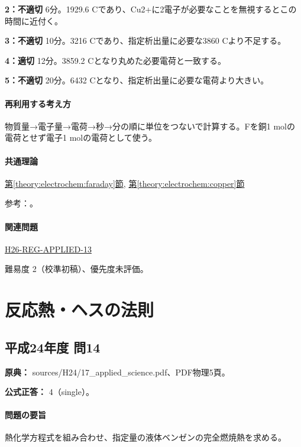 \noindent\textbf{2：不適切} 6分。1929.6 Cであり、Cu2+に2電子が必要なことを無視するとこの時間に近付く。\par

\noindent\textbf{3：不適切} 10分。3216 Cであり、指定析出量に必要な3860 Cより不足する。\par

\noindent\textbf{4：適切} 12分。3859.2 Cとなり丸めた必要電荷と一致する。\par

\noindent\textbf{5：不適切} 20分。6432 Cとなり、指定析出量に必要な電荷より大きい。\par

\paragraph{再利用する考え方} 物質量→電子量→電荷→秒→分の順に単位をつないで計算する。Fを銅1 molの電荷とせず電子1 molの電荷として使う。

\paragraph{共通理論} \hyperref[theory:electrochem:faraday]{第\ref*{theory:electrochem:faraday}節}, \hyperref[theory:electrochem:copper]{第\ref*{theory:electrochem:copper}節}

\par 参考：\cite{mit_redox2014}。

\paragraph{関連問題} \hyperref[q:h26-reg-applied-13]{H26-REG-APPLIED-13}

\par 難易度 2（校準初稿）、優先度未評価。

\section{反応熱・ヘスの法則}

\subsection{平成24年度 問14}
\label{q:h24-reg-applied-14}

\noindent\textbf{原典：} sources/H24/17\_applied\_science.pdf、PDF物理5頁。

\textbf{公式正答：} 4（single）。

\paragraph{問題の要旨} 熱化学方程式を組み合わせ、指定量の液体ベンゼンの完全燃焼熱を求める。

